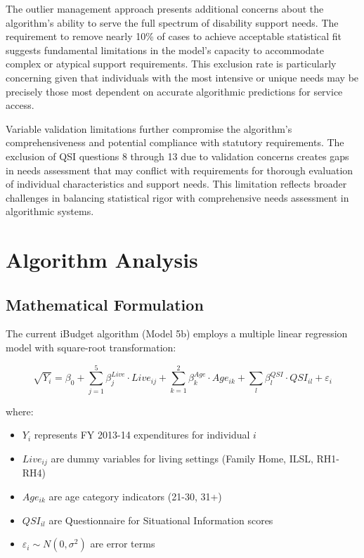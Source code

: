 The outlier management approach presents additional concerns about the algorithm's ability to serve the full spectrum of disability support needs. The requirement to remove nearly 10\% of cases to achieve acceptable statistical fit suggests fundamental limitations in the model's capacity to accommodate complex or atypical support requirements. This exclusion rate is particularly concerning given that individuals with the most intensive or unique needs may be precisely those most dependent on accurate algorithmic predictions for service access.

Variable validation limitations further compromise the algorithm's comprehensiveness and potential compliance with statutory requirements. The exclusion of QSI questions 8 through 13 due to validation concerns creates gaps in needs assessment that may conflict with requirements for thorough evaluation of individual characteristics and support needs. This limitation reflects broader challenges in balancing statistical rigor with comprehensive needs assessment in algorithmic systems.


\section{Algorithm Analysis}
\subsection{Mathematical Formulation}

The current iBudget algorithm (Model 5b) employs a multiple linear regression model with square-root transformation:

\begin{equation}
\sqrt{Y_i} = \beta_0 + \sum_{j=1}^{5} \beta_j^{Live} \cdot Live_{ij} + \sum_{k=1}^{2} \beta_k^{Age} \cdot Age_{ik} + \sum_{l} \beta_l^{QSI} \cdot QSI_{il} + \varepsilon_i
\end{equation}

where:
\begin{itemize}
    \item $Y_i$ represents FY 2013-14 expenditures for individual $i$
    \item $Live_{ij}$ are dummy variables for living settings (Family Home, ILSL, RH1-RH4)
    \item $Age_{ik}$ are age category indicators (21-30, 31+)
    \item $QSI_{il}$ are Questionnaire for Situational Information scores
    \item $\varepsilon_i \sim N(0, \sigma^2)$ are error terms
\end{itemize}

